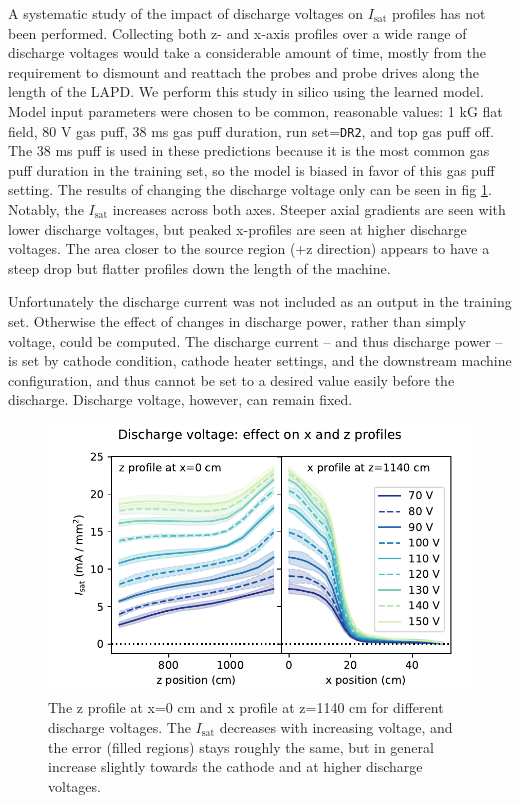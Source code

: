 A systematic study of the impact of discharge voltages on $I_\text{sat}$ profiles has not been performed. Collecting both z- and x-axis profiles over a wide range of discharge voltages would take a considerable amount of time, mostly from the requirement to dismount and reattach the probes and probe drives along the length of the LAPD. We perform this study in silico using the learned model. Model input parameters were chosen to be common, reasonable values: 1 kG flat field, 80 V gas puff, 38 ms gas puff duration, run set=\texttt{DR2}, and top gas puff off. The 38 ms puff is used in these predictions because it is the most common gas puff duration in the training set, so the model is biased in favor of this gas puff setting. The results of changing the discharge voltage only can be seen in fig \ref{fig:discharge_voltage_effect}. Notably, the $I_\text{sat}$ increases across both axes. Steeper axial gradients are seen with lower discharge voltages, but peaked x-profiles are seen at higher discharge voltages. The area closer to the source region (+z direction) appears to have a steep drop but flatter profiles down the length of the machine. 

 Unfortunately the discharge current was not included as an output in the training set. Otherwise the effect of changes in discharge power, rather than simply voltage, could be computed. The discharge current -- and thus discharge power -- is set by cathode condition, cathode heater settings, and the downstream machine configuration, and thus cannot be set to a desired value easily before the discharge. Discharge voltage, however, can remain fixed.

\begin{figure}
	\centering
	\includegraphics[width=\textwidth]{figures/discharge_voltage_effect.pdf}
	\caption[size=12]{\label{fig:discharge_voltage_effect}The z profile at x=0 cm and x profile at z=1140 cm for different discharge voltages. The $I_\text{sat}$ decreases with increasing voltage, and the error (filled regions) stays roughly the same, but in general increase slightly towards the cathode and at higher discharge voltages.}
\end{figure}

